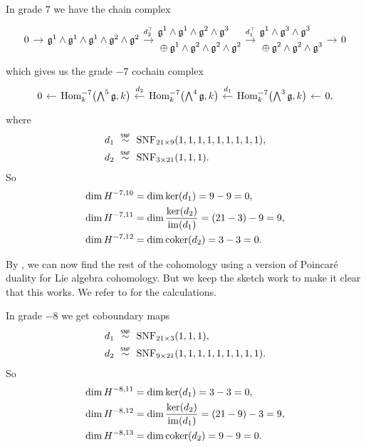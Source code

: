 In grade $7$ we have the chain complex
\[
  \begin{tikzcd}[ampersand replacement=\&, column sep=1em]
    0 \ar[r] \& \lie{g}^{1} \wedge \lie{g}^{1} \wedge \lie{g}^{1} \wedge \lie{g}^{2} \wedge \lie{g}^{2} \ar[r,"d_{2}^{\top}" {yshift=2pt}] \& \begin{aligned} &\lie{g}^{1} \wedge \lie{g}^{1} \wedge \lie{g}^{2} \wedge \lie{g}^{3} \\ &\oplus \lie{g}^{1} \wedge \lie{g}^{2} \wedge \lie{g}^{2} \wedge \lie{g}^{2} \end{aligned} \ar[r,"d_{1}^{\top}" {yshift=2pt}] \& \begin{aligned} &\lie{g}^{1} \wedge \lie{g}^{3} \wedge \lie{g}^{3} \\ &\oplus \lie{g}^{2} \wedge \lie{g}^{2} \wedge \lie{g}^{3} \end{aligned}\ar[r] \& 0
  \end{tikzcd}
\]
which gives us the grade $-7$ cochain complex
\[
  \begin{tikzcd}[column sep=1em]
    0 & \ar[l] \Hom_{k}^{-7}\bigl( \bigwedge^{5}\lie{g}, k \bigr) & \ar[l,"d_{2}"' {yshift=2pt}] \Hom_{k}^{-7}\bigl( \bigwedge^{4}\lie{g}, k \bigr) & \ar[l,"d_{1}"' {yshift=2pt}] \Hom_{k}^{-7}\bigl( \bigwedge^{3}\lie{g}, k \bigr) & \ar[l] 0,
  \end{tikzcd}
\]
where
\begin{align*}
  d_{1} &\snfsim \SNF_{21\times9}(1,1,1,1,1,1,1,1,1), \\
  d_{2} &\snfsim \SNF_{3\times21}(1,1,1).
\end{align*}
So
\begin{align*}
  \dim H^{-7,10} &= \dim \operatorname{ker}(d_{1}) = 9-9 = 0, \\
  \dim H^{-7,11} &= \dim \dfrac{\operatorname{ker}(d_{2})}{\operatorname{im}(d_{1})} = (21-3) - 9 = 9, \\
  \dim H^{-7,12} &= \dim \operatorname{coker}(d_{2}) = 3 - 3 = 0.
\end{align*}

By \cite[Chap~1 §3.6 and §3.7]{Fuks}, we can now find the rest of the cohomology using a version of Poincaré duality for Lie algebra cohomology. But we keep the sketch work to make it clear that this works. We refer to \cite{code} for the calculations.

In grade $-8$ we get coboundary maps
\begin{align*}
  d_{1} &\snfsim \SNF_{21\times3}(1,1,1), \\
  d_{2} &\snfsim \SNF_{9\times21}(1,1,1,1,1,1,1,1,1).
\end{align*}
So
\begin{align*}
  \dim H^{-8,11} &= \dim \operatorname{ker}(d_{1}) = 3-3 = 0, \\
  \dim H^{-8,12} &= \dim \dfrac{\operatorname{ker}(d_{2})}{\operatorname{im}(d_{1})} = (21-9) - 3 = 9, \\
  \dim H^{-8,13} &= \dim \operatorname{coker}(d_{2}) = 9 - 9 = 0.
\end{align*}


